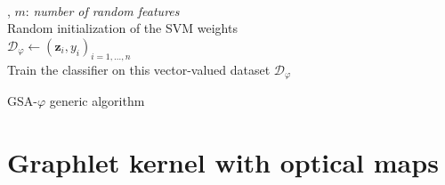 \documentclass{article}
\begin{document}

\begin{algorithm}
	\label{alg:gsa}
	\DontPrintSemicolon
	\\
	, $m$: \emph{number of random features}\\
	\Algo{\\}
	Random initialization of the SVM weights\\
	$\mathcal{D}_{\varphi}\gets (\mathbf{z}_i,y_i)_{i=1,\ldots, n}$\\
	Train the classifier on this vector-valued dataset $\mathcal{D}_{\varphi}$
	\caption{GSA-$\varphi$ generic algorithm}
\end{algorithm}

\section{Graphlet kernel with optical maps} \label{ssed to get a lowerec:pagestyle}
\end{document}
